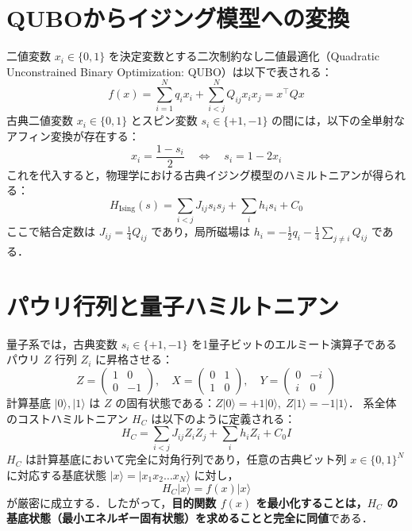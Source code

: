 \documentclass[11pt,a4paper,oneside,openany]{ltjsbook}
\theoremstyle{definition}
\theoremstyle{plain}
\theoremstyle{remark}
\newcommand{\ket}[1]{|#1\rangle}
\begin{document}
\section{QUBOからイジング模型への変換}
二値変数 $x_i \in \{0, 1\}$ を決定変数とする二次制約なし二値最適化（Quadratic Unconstrained Binary Optimization: QUBO）は以下で表される\cite{lucas2014ising}：
\begin{equation}
    f(x) = \sum_{i=1}^N q_i x_i + \sum_{i < j}^N Q_{ij} x_i x_j = x^\top Q x
\end{equation}
古典二値変数 $x_i \in \{0, 1\}$ とスピン変数 $s_i \in \{+1, -1\}$ の間には，以下の全単射なアフィン変換が存在する：
\begin{equation}
    x_i = \frac{1 - s_i}{2} \quad \Longleftrightarrow \quad s_i = 1 - 2x_i
\end{equation}
これを代入すると，物理学における古典イジング模型のハミルトニアンが得られる：
\begin{equation}
    H_{\text{Ising}}(s) = \sum_{i < j} J_{ij} s_i s_j + \sum_i h_i s_i + C_0
\end{equation}
ここで結合定数は $J_{ij} = \frac{1}{4} Q_{ij}$ であり，局所磁場は $h_i = -\frac{1}{2} q_i - \frac{1}{4}\sum_{j \neq i} Q_{ij}$ である．

\section{パウリ行列と量子ハミルトニアン}
量子系では，古典変数 $s_i \in \{+1, -1\}$ を1量子ビットのエルミート演算子であるパウリ $Z$ 行列 $Z_i$ に昇格させる：
\begin{equation}
    Z = \begin{pmatrix} 1 & 0 \\ 0 & -1 \end{pmatrix}, \quad 
    X = \begin{pmatrix} 0 & 1 \\ 1 & 0 \end{pmatrix}, \quad 
    Y = \begin{pmatrix} 0 & -i \\ i & 0 \end{pmatrix}
\end{equation}
計算基底 $\ket{0}, \ket{1}$ は $Z$ の固有状態である：$Z\ket{0} = +1\ket{0}, \; Z\ket{1} = -1\ket{1}$．
系全体のコストハミルトニアン $H_C$ は以下のように定義される：
\begin{equation}
    H_C = \sum_{i < j} J_{ij} Z_i Z_j + \sum_i h_i Z_i + C_0 I
\end{equation}
$H_C$ は計算基底において完全に対角行列であり，任意の古典ビット列 $x \in \{0, 1\}^N$ に対応する基底状態 $\ket{x} = \ket{x_1 x_2 \dots x_N}$ に対し，
\begin{equation}
    H_C \ket{x} = f(x) \ket{x}
\end{equation}
が厳密に成立する．したがって，\textbf{目的関数 $f(x)$ を最小化することは，$H_C$ の基底状態（最小エネルギー固有状態）を求めることと完全に同値}である．
\end{document}
